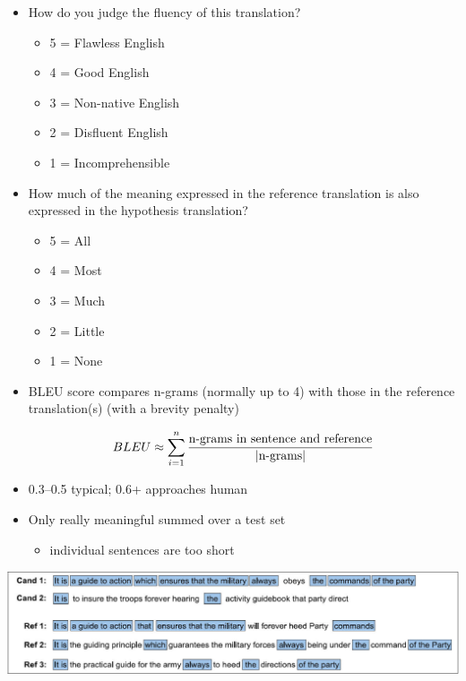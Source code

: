 \documentclass[a4paper,landscape,headrule,footrule,dvips]{foils}
\begin{document}
\begin{CJK}{UTF8}{min}
\begin{itemize}
\item {} How do you judge the fluency of this translation?
\begin{itemize}\item 5 = Flawless English 
\item 4 = Good English 
\item 3 = Non-native English 
\item 2 = Disfluent English 
\item 1 = Incomprehensible 
\end{itemize}
\item {} How much of the meaning expressed in the reference
  translation is also expressed in the hypothesis translation? 
\begin{itemize} 
\item 5 = All  
\item 4 = Most  
\item 3 = Much  
\item 2 = Little  
\item 1 = None 
\end{itemize}
\end{itemize}


\begin{itemize}
\item BLEU score compares n-grams (normally up to 4) with those in the
  reference translation(s) (with a brevity penalty)

\[BLEU \approx\sum_{i=1}^{n} \frac{\textnormal{n-grams in sentence and reference}}{|\textnormal{n-grams}|}\]

\item 0.3--0.5 typical; 0.6+ approaches human
\item Only really meaningful summed over a test set
  \begin{itemize}
  \item individual sentences are too short
  \end{itemize}
\end{itemize}




  \hspace{-3em}\includegraphics[width=1.1\textwidth]{include/25.31.jpg.eps}


\end{CJK}
\end{document}
